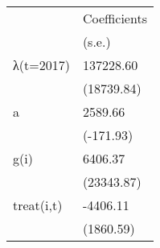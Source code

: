 \begin{tabular}{ll}
\toprule
{} & Coefficients \\
{} &       (s.e.) \\
\midrule
λ(t=2017)  &    137228.60 \\
           &   (18739.84) \\
a          &      2589.66 \\
           &    (-171.93) \\
g(i)       &      6406.37 \\
           &   (23343.87) \\
treat(i,t) &     -4406.11 \\
           &    (1860.59) \\
\bottomrule
\end{tabular}
